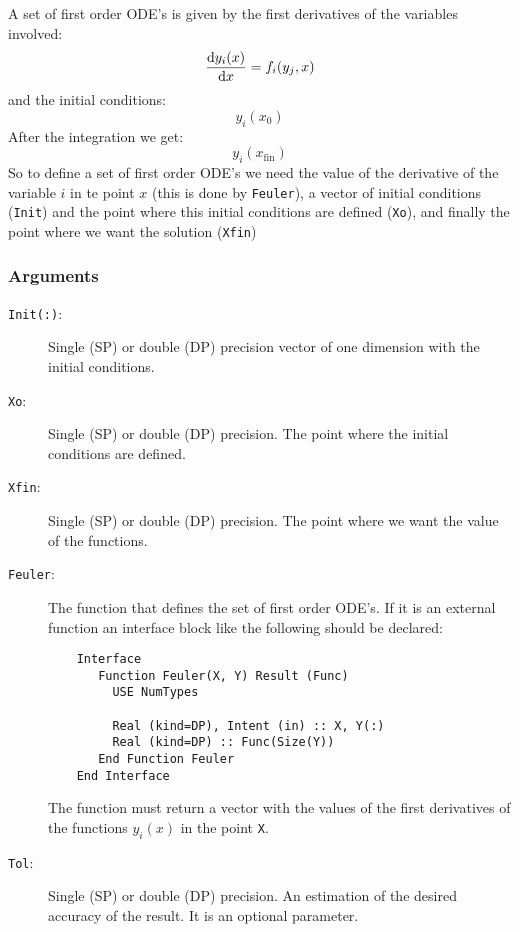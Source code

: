 A set of first order ODE's is given by the first derivatives of the
variables involved:
\begin{displaymath}
  \frac{\mathrm{d} y_i(x)}{\mathrm{d} x} = f_i(y_j, x)
\end{displaymath}
and the initial conditions:
\begin{displaymath}
  y_i(x_0)
\end{displaymath}
After the integration we get:
\begin{displaymath}
  y_i(x_{\text{fin}})
\end{displaymath}
So to define a set of first order ODE's we need the value of the
derivative of the variable $i$ in te point $x$ (this is done by
\texttt{Feuler}), a vector of initial conditions (\texttt{Init}) and
the point where this initial conditions are defined (\texttt{Xo}), and
finally the point where we want the solution (\texttt{Xfin})

\subsubsection{Arguments}

\begin{description}
\item[\texttt{Init(:)}:] Single (SP) or double (DP) precision vector of
  one dimension with the initial conditions.
\item[\texttt{Xo}:] Single (SP) or double (DP) precision. The point
  where the initial conditions are defined.
\item[\texttt{Xfin}:] Single (SP) or double (DP) precision. The point
  where we want the value of the functions.
\item[\texttt{Feuler}:] The function that defines the set of first order
  ODE's. If it is an external function an interface block like the
  following should be declared: 
\begin{verbatim}
    Interface
       Function Feuler(X, Y) Result (Func)
         USE NumTypes

         Real (kind=DP), Intent (in) :: X, Y(:)
         Real (kind=DP) :: Func(Size(Y))
       End Function Feuler
    End Interface
\end{verbatim}
The function must return a vector with the values of the first
derivatives of the functions $y_i(x)$ in the point \texttt{X}.
\item[\texttt{Tol}:] Single (SP) or double (DP) precision. An
  estimation of the desired accuracy of the result. It is an optional
  parameter.
\end{description}

